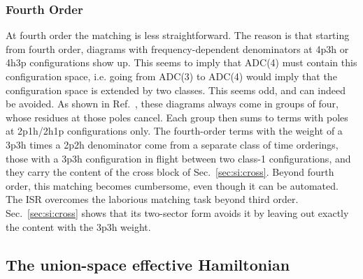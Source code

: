 \documentclass[aip,jcp,reprint,noshowkeys,superscriptaddress]{revtex4-2}
\theoremstyle{plain}
\theoremstyle{definition}
\theoremstyle{remark}
\begin{document}
\subsubsection{Fourth Order}
At fourth order the matching is less straightforward. The reason is that starting from fourth order, diagrams with frequency-dependent denominators at 4p3h or 4h3p configurations show up. This seems to imply that ADC(4) must contain this configuration space, i.e. going from ADC(3) to ADC(4) would imply that the configuration space is extended by two classes. This seems odd, and can indeed be avoided. As shown in Ref.~, these diagrams always come in groups of four, whose residues at those poles cancel. Each group then sums to terms with poles at 2p1h/2h1p configurations only. The fourth-order terms with the weight of a 3p3h times a 2p2h denominator come from a separate class of time orderings, those with a 3p3h configuration in flight between two class-1 configurations, and they carry the content of the cross block of Sec.~\ref{sec:si:cross}. Beyond fourth order, this matching becomes cumbersome, even though it can be automated. The ISR overcomes the laborious matching task beyond third order.\cite{Schirmer_1991} Sec.~\ref{sec:si:cross} shows that its two-sector form avoids it by leaving out exactly the content with the 3p3h weight.

\subsection{\label{sec:si:isr}The union-space effective Hamiltonian}
\end{document}
